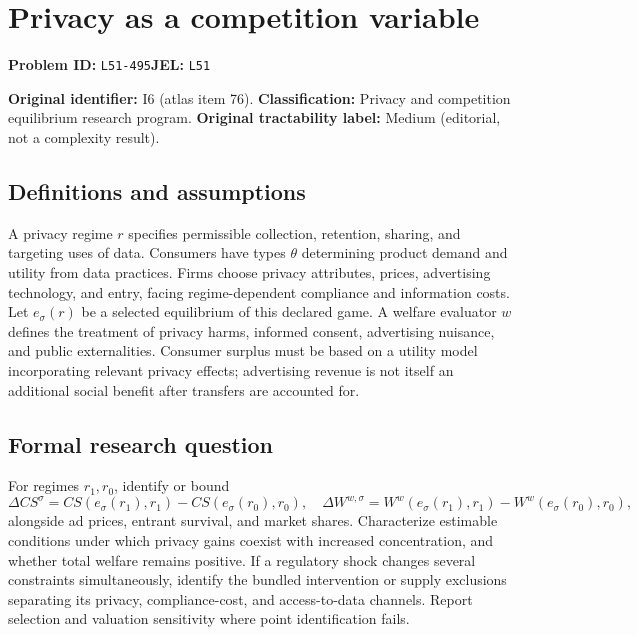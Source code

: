 \documentclass[11pt,a4paper]{article}
\begin{document}
\section*{Privacy as a competition variable}
\textbf{Problem ID:} \texttt{L51-495}\quad \textbf{JEL:} \texttt{L51}\par
\label{problem:OP-0076}
\label{atlas:prob:I6}

\noindent\textbf{Original identifier:} I6 (atlas item 76). \textbf{Classification:} Privacy and competition equilibrium research program. \textbf{Original tractability label:} Medium (editorial, not a complexity result).

\subsection*{Definitions and assumptions}

A privacy regime $r$ specifies permissible collection, retention, sharing, and targeting uses of data. Consumers have types $\theta$ determining product demand and utility from data practices. Firms choose privacy attributes, prices, advertising technology, and entry, facing regime-dependent compliance and information costs. Let $e_\sigma(r)$ be a selected equilibrium of this declared game. A welfare evaluator $w$ defines the treatment of privacy harms, informed consent, advertising nuisance, and public externalities. Consumer surplus must be based on a utility model incorporating relevant privacy effects; advertising revenue is not itself an additional social benefit after transfers are accounted for.

\subsection*{Formal research question}

For regimes $r_1,r_0$, identify or bound
\[
\Delta CS^\sigma=CS(e_\sigma(r_1),r_1)-CS(e_\sigma(r_0),r_0),\quad
\Delta W^{w,\sigma}=W^w(e_\sigma(r_1),r_1)-W^w(e_\sigma(r_0),r_0),
\]
alongside ad prices, entrant survival, and market shares. Characterize estimable conditions under which privacy gains coexist with increased concentration, and whether total welfare remains positive. If a regulatory shock changes several constraints simultaneously, identify the bundled intervention or supply exclusions separating its privacy, compliance-cost, and access-to-data channels. Report selection and valuation sensitivity where point identification fails.
\end{document}

